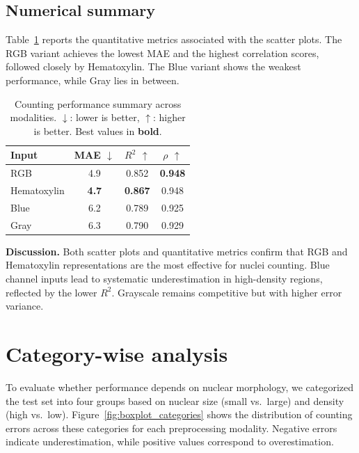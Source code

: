 \documentclass[target=bach,aauheader=,style=]{thud}
\begin{document}
\subsection{Numerical summary}
Table~\ref{tab:counting_results} reports the quantitative metrics associated with the scatter plots. 
The RGB variant achieves the lowest MAE and the highest correlation scores, followed closely by Hematoxylin. 
The Blue variant shows the weakest performance, while Gray lies in between.

\begin{table}[h]
    \centering
    \caption{Counting performance summary across modalities. $\downarrow$: lower is better, $\uparrow$: higher is better. Best values in \textbf{bold}.}
    \label{tab:counting_results}
    \begin{tabular}{lccc}
        \hline
        \textbf{Input} & \textbf{MAE} $\downarrow$ & \textbf{$R^2$} $\uparrow$ & \textbf{$\rho$} $\uparrow$ \\
        \hline
        RGB         & 4.9 & 0.852 & \textbf{0.948} \\
        Hematoxylin & \textbf{4.7}          & \textbf{0.867}          & 0.948 \\
        Blue        & 6.2          & 0.789          & 0.925 \\
        Gray        & 6.3          & 0.790          & 0.929 \\
        \hline
    \end{tabular}
\end{table}

\noindent\textbf{Discussion.} 
Both scatter plots and quantitative metrics confirm that RGB and Hematoxylin representations are the most effective for nuclei counting. 
Blue channel inputs lead to systematic underestimation in high-density regions, reflected by the lower $R^2$. 
Grayscale remains competitive but with higher error variance.

\section{Category-wise analysis}
To evaluate whether performance depends on nuclear morphology, we categorized the test set into four groups based on nuclear size (small vs.~large) and density (high vs.~low). 
Figure~\ref{fig:boxplot_categories} shows the distribution of counting errors across these categories for each preprocessing modality. 
Negative errors indicate underestimation, while positive values correspond to overestimation.
\end{document}
